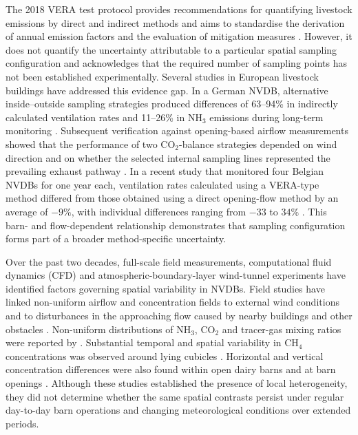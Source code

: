 \documentclass[12pt,a4paper]{article}
\begin{document}
The 2018 VERA test protocol provides recommendations for quantifying livestock emissions by direct and indirect methods and aims to standardise the derivation of annual emission factors and the evaluation of mitigation measures \citep{VERA2018}. However, it does not quantify the uncertainty attributable to a particular spatial sampling configuration and acknowledges that the required number of sampling points has not been established experimentally. Several studies in European livestock buildings have addressed this evidence gap. In a German NVDB, alternative inside--outside sampling strategies produced differences of 63--94\% in indirectly calculated ventilation rates and 11--26\% in \(\mathrm{NH_3}\) emissions during long-term monitoring \citep{JankeSampling2020}. Subsequent verification against opening-based airflow measurements showed that the performance of two \(\mathrm{CO_2}\)-balance strategies depended on wind direction and on whether the selected internal sampling lines represented the prevailing exhaust pathway \citep{Janke2022}. In a recent study that monitored four Belgian NVDBs for one year each, ventilation rates calculated using a VERA-type method differed from those obtained using a direct opening-flow method by an average of \(-9\%\), with individual differences ranging from \(-33\) to \(34\%\) \citep{Declerck2025}. This barn- and flow-dependent relationship demonstrates that sampling configuration forms part of a broader method-specific uncertainty.

Over the past two decades, full-scale field measurements, computational fluid dynamics (CFD) and atmospheric-boundary-layer wind-tunnel experiments have identified factors governing spatial variability in NVDBs. Field studies have linked non-uniform airflow and concentration fields to external wind conditions and to disturbances in the approaching flow caused by nearby buildings and other obstacles \citep{Fiedler2014,Schmithausen2018,Koenig2018}. Non-uniform distributions of \(\mathrm{NH_3}\), \(\mathrm{CO_2}\) and tracer-gas mixing ratios were reported by \citet{Mendes2015}. Substantial temporal and spatial variability in \(\mathrm{CH_4}\) concentrations was observed around lying cubicles \citep{Wu2016}. Horizontal and vertical concentration differences were also found within open dairy barns and at barn openings \citep{Durso2022,Durso2024,Sahu2023}. Although these studies established the presence of local heterogeneity, they did not determine whether the same spatial contrasts persist under regular day-to-day barn operations and changing meteorological conditions over extended periods.
\end{document}
